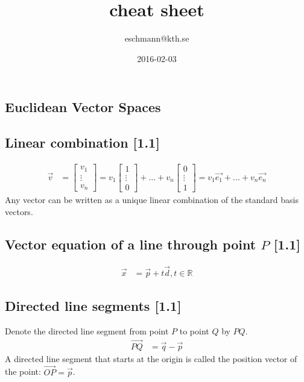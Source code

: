 \documentclass[a4paper,9pt]{extarticle}
\title{cheat sheet}
\author{eschmann@kth.se}
\date{2016-02-03}
\begin{document}
\begin{multicols*}{2}


\section{Euclidean Vector Spaces}
\subsection{Linear combination [1.1]}
\begin{equation} \label{1.1-1}
    \begin{split}
        \vec{v} & = \begin{bmatrix}v_1 \\ \vdots \\ v_n\end{bmatrix} 
            = v_1\begin{bmatrix}1 \\ \vdots \\ 0\end{bmatrix} + ... + 
            v_n\begin{bmatrix}0 \\ \vdots \\ 1\end{bmatrix}
            = v_1 \vec{e_1} + ... + v_n \vec{e_n}
    \end{split}
\end{equation}
Any vector can be written as a unique linear combination of the standard basis vectors.


\subsection{Vector equation of a line through point $P$ [1.1]}
\begin{equation} \label{1.1-2}
    \begin{split}
        \vec{x} & = \vec{p} + t \vec{d}, t \in \mathbb{R}
    \end{split}
\end{equation}


\subsection{Directed line segments [1.1]}
Denote the directed line segment from point $P$ to point $Q$ by $PQ$.
\begin{equation} \label{1.1-3}
    \begin{split}
        \vec{PQ} & = \vec{q} - \vec{p}
    \end{split}
\end{equation}
A directed line segment that starts at the origin is called the position vector of the point: $\vec{OP} = \vec{p}$.


\end{multicols*}
\end{document}
